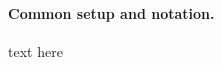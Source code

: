 \documentclass[11pt]{article}
\begin{document}
\paragraph{Common setup and notation.} text here
\end{document}

